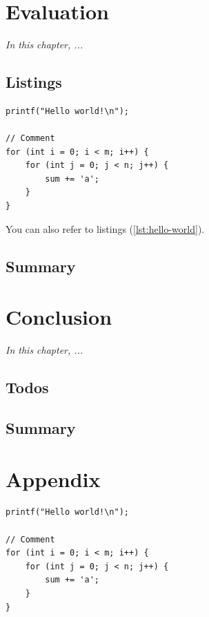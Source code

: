 \documentclass[
	12pt,
	a4paper,
	abstract,
	bibliography=totoc,
	chapterprefix,
	numbers=endperiod,
	parskip=half,
]{scrreprt}
\begin{document}
\chapter{Evaluation}
\label{cha:evaluation}

\textit{In this chapter, ...}

\section{Listings}

\begin{lstlisting}[caption=Caption,label=lst:hello-world]
printf("Hello world!\n");

// Comment
for (int i = 0; i < m; i++) {
	for (int j = 0; j < n; j++) {
		sum += 'a';
	}
}
\end{lstlisting}

You can also refer to listings (\cref{lst:hello-world}).

\section*{Summary}

\lipsum[2]

\chapter{Conclusion}
\label{cha:conclusion}

\textit{In this chapter, ...}

\section{Todos}


\lipsum[1-2]

\section*{Summary}

\lipsum[2]




\appendix

\chapter{Appendix}
\label{cha:appendix}

\begin{lstlisting}[caption=Caption]
printf("Hello world!\n");

// Comment
for (int i = 0; i < m; i++) {
	for (int j = 0; j < n; j++) {
		sum += 'a';
	}
}
\end{lstlisting}
\end{document}

